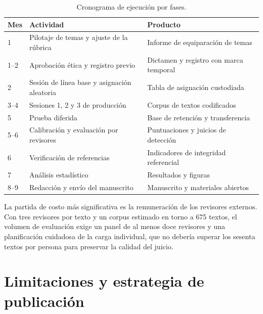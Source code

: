 \documentclass[12pt,a4paper,openany]{report}
\begin{document}
    \begin{table}[htbp]
        \centering
        \caption{Cronograma de ejecuci\'on por fases.}
        \label{tab:cronograma}
        \small
        \begin{tabular}{C{1.6cm} L{7.2cm} L{5.0cm}}
            \toprule
            \textbf{Mes} & \textbf{Actividad} & \textbf{Producto} \\
             & Pilotaje de temas y ajuste de la r\'ubrica & Informe de equiparaci\'on de temas \\
            1--2 & Aprobaci\'on \'etica y registro previo & Dictamen y registro con marca temporal \\
            2 & Sesi\'on de l\'inea base y asignaci\'on aleatoria & Tabla de asignaci\'on custodiada \\
            3--4 & Sesiones 1, 2 y 3 de producci\'on & Corpus de textos codificados \\
            5 & Prueba diferida & Base de retenci\'on y transferencia \\
            5--6 & Calibraci\'on y evaluaci\'on por revisores & Puntuaciones y juicios de detecci\'on \\
            6 & Verificaci\'on de referencias & Indicadores de integridad referencial \\
            7 & An\'alisis estad\'istico & Resultados y figuras \\
            8--9 & Redacci\'on y env\'io del manuscrito & Manuscrito y materiales abiertos \\
            \bottomrule
        \end{tabular}
    \end{table}
    
    La partida de costo m\'as significativa es la remuneraci\'on de los revisores externos. Con tres revisores por texto y un corpus estimado en torno a 675 textos, el volumen de evaluaci\'on exige un panel de al menos doce revisores y una planificaci\'on cuidadosa de la carga individual, que no deber\'ia superar los sesenta textos por persona para preservar la calidad del juicio.
    
    \chapter{Limitaciones y estrategia de publicaci\'on}
    
\end{document}

